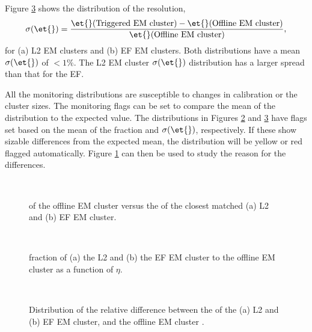 Figure \ref{SW_egamma_L2EF_Reso} shows the distribution of the \et{} resolution,
\begin{equation}
\sigma(\et{}) =\frac{\et{}(\rm{Triggered~EM~cluster})-\et{}(\rm{Offline~EM~cluster})}{\et{}(\rm{Offline~EM~cluster})},
\label{SW:EtReso}
\end{equation}
for (a) L2 EM clusters and (b) EF EM clusters.
Both distributions have a mean $\sigma(\et{})$ of $<1\%$. 
The L2 EM cluster $\sigma(\et{})$ distribution has a larger spread than that for the EF.


All the monitoring distributions are susceptible to changes in calibration or the cluster sizes. 
The monitoring flags can be set to compare the mean of the distribution to the expected value.
The distributions in Figures \ref{SW_egamma_L2EF_EtFrac} and \ref{SW_egamma_L2EF_Reso} have flags set based on the mean of the \et{} fraction and $\sigma(\et{})$, respectively. 
If these show sizable differences from the expected mean, the distribution will be yellow or red flagged automatically.
Figure \ref{SW_egamma_L2EF_EtEt} can then be used to study the reason for the differences.

 
\begin{figure}
\centering
\mbox{
}
\caption[Offline EM \et{} versus L2 and EF EM \et{}]{
\et{} of the offline EM cluster versus the \et{} of the closest matched (a) L2 and (b) EF EM cluster.
\label{SW_egamma_L2EF_EtEt}}
\end{figure}

\begin{figure}
\centering
\mbox{
}
\caption[\et{} fraction of L2 and EF to offline EM objects]{
\et{} fraction of (a) the  L2 and (b) the EF EM cluster  to the offline EM cluster \et{} as a function of $\eta$. 
\label{SW_egamma_L2EF_EtFrac}}
\end{figure}

\begin{figure}
\centering
\mbox{
}
\caption[Offline EM \et{} versus L2/EF EM \et{}]{
Distribution of the relative difference between the \et{} of the (a) L2 and (b) EF EM cluster, and the offline EM cluster \et{}.
\label{SW_egamma_L2EF_Reso}}
\end{figure}


